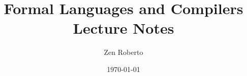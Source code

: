 \documentclass[a4paper]{book}
\begin{document}
\title{Formal Languages and Compilers\\Lecture Notes}
\author{Zen Roberto}
\date{\today}
\maketitle



\tableofcontents




\end{document}
